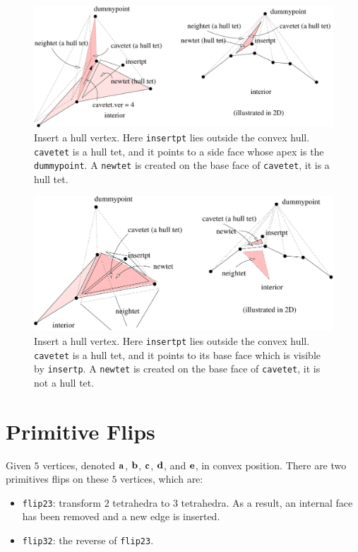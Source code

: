 \begin{figure}
  \centering
  \includegraphics[width=1.0\textwidth]{../figs/bowyerwatson2}
\caption{Insert a hull vertex. Here {\tt insertpt} lies outside the convex hull. {\tt cavetet} is a hull tet, and it points to a side face whose apex is the {\tt dummypoint}. A {\tt newtet} is created on the base face of {\tt cavetet}, it is a hull tet.}
\label{fig:bowyerwatson2}
\end{figure}

\begin{figure}
  \centering
  \includegraphics[width=1.0\textwidth]{../figs/bowyerwatson3}
\caption{Insert a hull vertex. Here {\tt insertpt} lies outside the convex hull. {\tt cavetet} is a hull tet, and it points to its base face which is visible by {\tt insertp}. A {\tt newtet} is created on the base face of {\tt cavetet}, it is not a hull tet.}
\label{bowyerwatson3}
\end{figure}

\section{Primitive Flips}

Given $5$ vertices, denoted ${\bf a}$, ${\bf b}$, ${\bf c}$, ${\bf d}$, and ${\bf e}$, in convex position. There are two primitives flips on these $5$ vertices, which are:
\begin{itemize}
\item {\tt flip23}: transform $2$ tetrahedra to $3$ tetrahedra. As a result, an internal face has been removed and a new edge is inserted.
\item {\tt flip32}: the reverse of {\tt flip23}.
\end{itemize}

